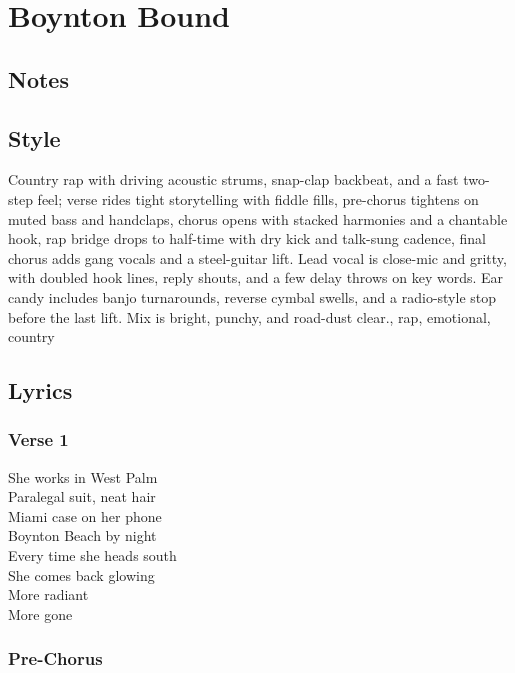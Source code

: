 \documentclass[]{article}
\begin{document}
\section{Boynton Bound}\label{boynton-bound}

\subsection{Notes}\label{notes-17}

\subsection{Style}\label{style-17}

Country rap with driving acoustic strums, snap-clap backbeat, and a fast
two-step feel; verse rides tight storytelling with fiddle fills,
pre-chorus tightens on muted bass and handclaps, chorus opens with
stacked harmonies and a chantable hook, rap bridge drops to half-time
with dry kick and talk-sung cadence, final chorus adds gang vocals and a
steel-guitar lift. Lead vocal is close-mic and gritty, with doubled hook
lines, reply shouts, and a few delay throws on key words. Ear candy
includes banjo turnarounds, reverse cymbal swells, and a radio-style
stop before the last lift. Mix is bright, punchy, and road-dust clear.,
rap, emotional, country

\subsection{Lyrics}\label{lyrics-17}

\subsubsection{Verse 1}\label{verse-1-10}

She works in West Palm\\
Paralegal suit, neat hair\\
Miami case on her phone\\
Boynton Beach by night\\
Every time she heads south\\
She comes back glowing\\
More radiant\\
More gone

\subsubsection{Pre-Chorus}\label{pre-chorus-14}
\end{document}
